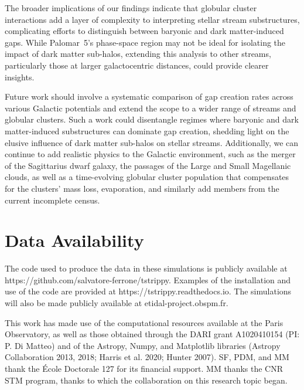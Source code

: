 \documentclass{aa}
\begin{document}
  The broader implications of our findings indicate that globular cluster interactions add a layer of complexity to interpreting stellar stream substructures, complicating efforts to distinguish between baryonic and dark matter-induced gaps. While Palomar~5's phase-space region may not be ideal for isolating the impact of dark matter sub-halos, extending this analysis to other streams, particularly those at larger galactocentric distances, could provide clearer insights. 

  Future work should involve a systematic comparison of gap creation rates across various Galactic potentials and extend the scope to a wider range of streams and globular clusters. Such a work could disentangle regimes where baryonic and dark matter-induced substructures can dominate gap creation, shedding light on the elusive influence of dark matter sub-halos on stellar streams. Additionally, we can continue to add realistic physics to the Galactic environment, such as the merger of the Sagittarius dwarf galaxy, the passages of the Large and Small Magellanic clouds, as well as a time-evolving globular cluster population that compensates for the clusters' mass loss, evaporation, and similarly add members from the current incomplete census.


  
\section*{Data Availability}

  The code used to produce the data in these simulations is publicly available at https://github.com/salvatore-ferrone/tstrippy. Examples of the installation and use of the code are provided at https://tstrippy.readthedocs.io. The simulations will also be made publicly available at etidal-project.obspm.fr.



\begin{acknowledgements}
  This work has made use of the computational resources available at the Paris Observatory, as well as those obtained through the DARI grant A1020410154 (PI: P. Di Matteo) and of the Astropy, Numpy, and Matplotlib libraries (Astropy Collaboration 2013, 2018; Harris et al. 2020; Hunter 2007). SF, PDM, and MM thank the École Doctorale 127 for its financial support. MM thanks the CNR STM program, thanks to which the collaboration on this research topic began. 
\end{acknowledgements}
\end{document}
